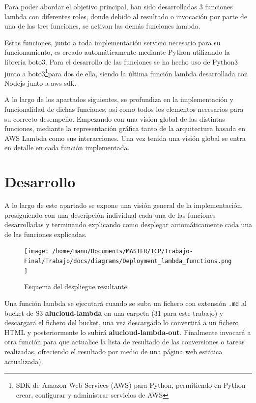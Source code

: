 \documentclass[
]{article}
\begin{document}
Para poder abordar el objetivo principal, han sido desarrolladas 3
funciones lambda con diferentes roles, donde debido al resultado o
invocación por parte de una de las tres funciones, se activan las demás
funciones lambda.

Estas funciones, junto a toda implementación servicio necesario para su
funcionamiento, es creado automáticamente mediante Python utilizando la
librería boto3. Para el desarrollo de las funciones se ha hecho uso de
Python3 junto a boto3\footnote{SDK de Amazon Web Services (AWS) para
  Python, permitiendo en Python crear, configurar y administrar
  servicios de AWS}para dos de ella, siendo la última función lambda
desarrollada con Nodejs junto a aws-sdk.

A lo largo de los apartados siguientes, se profundiza en la
implementación y funcionalidad de dichas funciones, así como todos los
elementos necesarios para su correcto desempeño. Empezando con una
visión global de las distintas funciones, mediante la representación
gráfica tanto de la arquitectura basada en AWS Lambda como sus
interacciones. Una vez tenida una visión global se entra en detalle en
cada función implementada.
\newpage
\hypertarget{header-n19}{%
\section{Desarrollo}\label{header-n19}}

A lo largo de este apartado se expone una visión general de la
implementación, prosiguiendo con una descripción individual cada una de
las funciones desarrolladas y terminando explicando como desplegar
automáticamente cada una de las funciones explicadas.

\begin{figure}[H]
\centering
\texttt{[image: /home/manu/Documents/MASTER/ICP/Trabajo-Final/Trabajo/docs/diagrams/Deployment\_lambda\_functions.png]}
\caption{Esquema del despliegue resultante}
\end{figure}

Una función lambda se ejecutará cuando se suba un fichero con extensión
\texttt{.md} al bucket de S3 \textbf{alucloud-lambda} en una carpeta (31
para este trabajo) y descargará el fichero del bucket, una vez
descargado lo convertirá a un fichero HTML y posteriormente lo subirá
\textbf{alucloud-lambda-out}. Finalmente invocará a otra función para
que actualice la lista de resultado de las conversiones o tareas
realizadas, ofreciendo el resultado por medio de una página web estática
actualizada).
\end{document}

